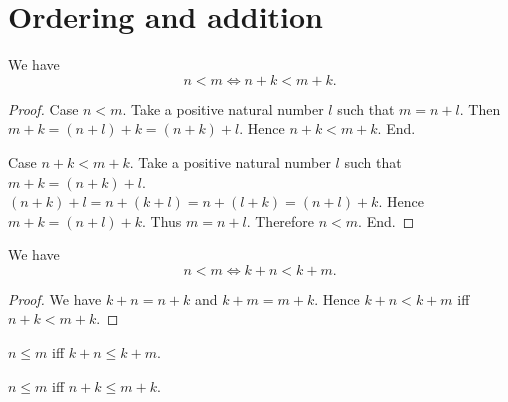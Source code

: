 \documentclass[../../natural-numbers.ftl.tex]{subfiles}
\begin{document}


  \section{Ordering and addition}

  \begin{forthel}
    \begin{proposition}[NN 02 02 179654]
      We have \[ n < m \iff n + k < m + k. \]
    \end{proposition}
    \begin{proof}
      Case $n < m$.
        Take a positive natural number $l$ such that $m = n + l$.
        Then $m + k = (n + l) + k = (n + k) + l$.
        Hence $n + k < m + k$.
      End.

      Case $n + k < m + k$.
        Take a positive natural number $l$ such that $m + k = (n + k) + l$.
        $(n + k) + l = n + (k + l) = n + (l + k) = (n + l) + k$.
        Hence $m + k = (n + l) + k$.
        Thus $m = n + l$.
        Therefore $n < m$.
      End.
    \end{proof}


    \begin{corollary}[NN 02 02 316437]
      We have \[ n < m \iff k + n < k + m. \]
    \end{corollary}
    \begin{proof}
      We have $k + n = n + k$ and $k + m = m + k$.
      Hence $k + n < k + m$ iff $n + k < m + k$.
    \end{proof}


    \begin{corollary}[NN 02 02 143631]
      $n \leq m$ iff $k + n \leq k + m$.
    \end{corollary}

    \begin{corollary}[NN 02 02 598206]
      $n \leq m$ iff $n + k \leq m + k$.
    \end{corollary}
  \end{forthel}
\end{document}
